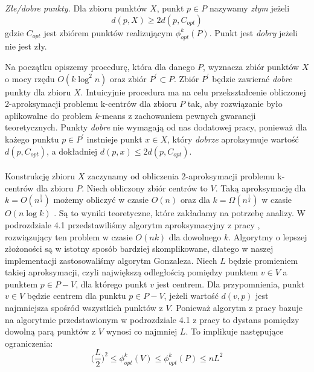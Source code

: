 \begin{definition}
    \emph{Złe/dobre punkty.} Dla zbioru punktów $X$, punkt $p \in P$ nazywamy \textit{złym} jeżeli
    \begin{equation}
        d(p, X) \geq 2d(p, C_{opt})
    \end{equation}
    gdzie $C_{opt}$ jest zbiórem punktów realizującym $\phi_{opt}^{k}(P)$.
    Punkt jest \textit{dobry} jeżeli nie jest zły.
\end{definition}

\noindent
Na początku opiszemy procedurę, która dla danego $P$, wyznacza zbiór punktów $X$ o mocy rzędu $O(k \log^{2}n)$ oraz zbiór $P^{'} \subset P$.
Zbiór $P^{'}$ będzie zawierać \textit{dobre} punkty dla zbioru $X$.
Intuicyjnie procedura ma na celu przekształcenie obliczonej 2-aproksymacji problemu k-centrów dla zbioru $P$ tak, aby rozwiązanie było aplikowalne do problem $k$-means z zachowaniem pewnych gwarancji teoretycznych.
Punkty \textit{dobre} nie wymagają od nas dodatowej pracy, ponieważ dla każego punktu $p \in P^{'}$ instnieje punkt $x \in X$, który \textit{dobrze} aproksymuje wartość $d(p, C_{opt})$, a dokładniej $ d(p, x) \leq 2d(p, C_{opt})$.
\\~\\
Konstrukcję zbioru $X$ zaczynamy od obliczenia 2-aproksymacji problemu k-centrów dla zbioru $P$.
Niech obliczony zbiór centrów to $V$.
Taką aproksymację dla $k = O(n^{\frac{1}{4}})$ możemy obliczyć w czasie $O(n)$ \cite{10.5555/3116656.3116964} oraz dla $k = \Omega(n^{\frac{1}{4}})$ w czasie $O(n \log k)$ \cite{10.1145/62212.62255}.
Są to wyniki teoretyczne, które zakładamy na potrzebę analizy.
W podrozdziale 4.1 przedstawiliśmy algorytm aproksymacyjny z pracy \cite{Gonzalez1985ClusteringTM}, rozwiązujący ten problem w czasie $O(nk)$ dla dowolnego $k$.
Algorytmy o lepszej złożoności są w istotny sposób bardziej skomplikowane, dlatego w naszej implementacji zastosowaliśmy algorytm Gonzaleza.
Niech $L$ będzie promieniem takiej aproksymacji, czyli największą odległością pomiędzy punktem $v \in V$ a punktem $p \in P-V$, dla którego punkt $v$ jest centrem.
Dla przypomnienia, punkt $v \in V$ będzie centrem dla punktu $p \in P-V$, jeżeli wartość $d(v,p)$ jest najmniejsza spośród wszystkich punktów z $V$.
Ponieważ algorytm z pracy \cite{10.1145/62212.62255} bazuje na algorytmie przedstawionym w podrozdziale 4.1 z pracy \cite{Gonzalez1985ClusteringTM} to dystans pomiędzy dowolną parą punktów z $V$ wynosi co najmniej $L$.
To implikuje następujące ograniczenia:
\begin{equation}
    \Big( \frac{L}{2 } \Big)^2 \leq \phi_{opt}^{k}(V) \leq \phi_{opt}^{k}(P) \leq nL^{2}
\end{equation}
